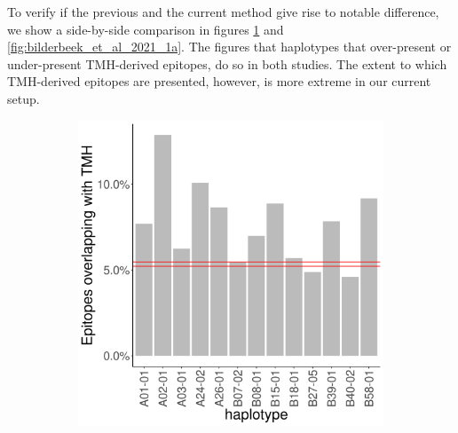 
To verify if the previous and the current method give rise to
notable difference, we show a side-by-side comparison
in figures \ref{fig:bianch_et_al_2017_1a} and \ref{fig:bilderbeek_et_al_2021_1a}.
The figures that haplotypes that over-present or under-present TMH-derived epitopes,
do so in both studies. The extent to which TMH-derived epitopes are
presented, however, is more extreme in our current setup.

\begin{figure}
  \centering
  \begin{subfigure}[t]{0.45\textwidth}
    \centering
    \caption{}
    \includegraphics[width=\linewidth]{bianchi_et_al_2017_results/figure-1-a.png} %
    \label{fig:bianch_et_al_2017_1a}
  \end{subfigure}
  \hfill
  \begin{subfigure}[t]{0.45\textwidth}
    \centering
    \caption{}

\end{subfigure}
\end{figure}

